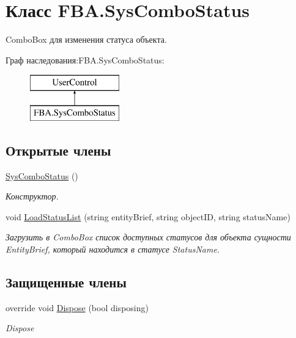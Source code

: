 \hypertarget{class_f_b_a_1_1_sys_combo_status}{}\section{Класс F\+B\+A.\+Sys\+Combo\+Status}
\label{class_f_b_a_1_1_sys_combo_status}


Combo\+Box для изменения статуса объекта.  


Граф наследования\+:F\+B\+A.\+Sys\+Combo\+Status\+:\begin{figure}[H]
\begin{center}
\leavevmode
\includegraphics[height=2.000000cm]{class_f_b_a_1_1_sys_combo_status}
\end{center}
\end{figure}
\subsection*{Открытые члены}
\begin{DoxyCompactItemize}
\item 
\mbox{\hyperlink{class_f_b_a_1_1_sys_combo_status_a9360d1bb409e63f9920a4864eef625cb}{Sys\+Combo\+Status}} ()
\begin{DoxyCompactList}\small\item\em Конструктор. \end{DoxyCompactList}\item 
void \mbox{\hyperlink{class_f_b_a_1_1_sys_combo_status_a4104815b6d22fedc00bcba336f369fda}{Load\+Status\+List}} (string entity\+Brief, string object\+ID, string status\+Name)
\begin{DoxyCompactList}\small\item\em Загрузить в Combo\+Box список доступных статусов для объекта сущности Entity\+Brief, который находится в статусе Status\+Name. \end{DoxyCompactList}\end{DoxyCompactItemize}
\subsection*{Защищенные члены}
\begin{DoxyCompactItemize}
\item 
override void \mbox{\hyperlink{class_f_b_a_1_1_sys_combo_status_a5b76093674ed209513697216ec9675db}{Dispose}} (bool disposing)
\begin{DoxyCompactList}\small\item\em Dispose \end{DoxyCompactList}\end{DoxyCompactItemize}


